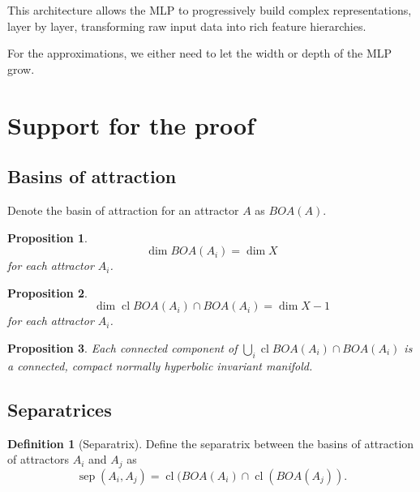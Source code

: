 \documentclass{article}
\newtheorem{proposition}{Proposition}
\theoremstyle{definition}
\newtheorem{definition}{Definition}
\theoremstyle{remark}
\newcommand{\sep}{\operatorname{sep}}
\newcommand{\cl}{\operatorname{cl}}
\begin{document}
This architecture allows the MLP to progressively build complex representations, layer by layer, transforming raw input data into rich feature hierarchies.


For the approximations, we either need to let the width or depth of the MLP grow.

\section{Support for the proof}

\subsection{Basins of attraction}
Denote the basin of attraction for an attractor $A$ as $BOA(A)$.

\begin{proposition}
\[\dim BOA(A_i) = \dim X\] for each attractor $A_i$.
\end{proposition}

\begin{proposition}
\[\dim\cl BOA(A_i) \cap BOA(A_i) = \dim X - 1 \] for each attractor $A_i$.
\end{proposition}

\begin{proposition}
Each connected component of $\bigcup_i\cl BOA(A_i) \cap BOA(A_i) $ is a connected, compact normally hyperbolic invariant manifold. %
\end{proposition}


\subsection{Separatrices}

\begin{definition}[Separatrix]\label{def:separatrix}
Define the separatrix between the basins of attraction of attractors $A_i$ and $A_j$ as 
\begin{equation}
\sep(A_i,A_j) = \cl(BOA(A_i)\cap \cl(BOA(A_j)).
\end{equation}
\end{definition}
\end{document}
